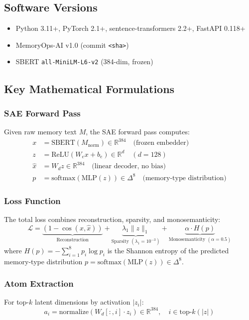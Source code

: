 \documentclass[11pt]{article}
\newcommand{\R}{\mathbb{R}}
\begin{document}
\subsection{Software Versions}
\begin{itemize}
  \item Python 3.11+, PyTorch 2.1+, sentence-transformers 2.2+, FastAPI 0.118+
  \item MemoryOps-AI v1.0 (commit \texttt{<sha>})
  \item SBERT \texttt{all-MiniLM-L6-v2} (384-dim, frozen)
\end{itemize}

\subsection{Key Mathematical Formulations}

\subsubsection{SAE Forward Pass}
Given raw memory text $M$, the SAE forward pass computes:
\begin{align}
x &= \text{SBERT}(M_{\text{norm}}) \in \R^{384} \quad \text{(frozen embedder)} \\
z &= \text{ReLU}(W_e x + b_e) \in \R^{d} \quad (d=128) \\
\hat{x} &= W_d z \in \R^{384} \quad \text{(linear decoder, no bias)} \\
p &= \text{softmax}(\text{MLP}(z)) \in \Delta^{8} \quad \text{(memory-type distribution)}
\end{align}

\subsubsection{Loss Function}
The total loss combines reconstruction, sparsity, and monosemanticity:
\begin{equation}
\mathcal{L} = \underbrace{(1 - \cos(x,\hat{x}))}_{\text{Reconstruction}} 
+ \underbrace{\lambda_1 \|z\|_1}_{\text{Sparsity } (\lambda_1=10^{-3})}
+ \underbrace{\alpha \cdot H(p)}_{\text{Monosemanticity } (\alpha=0.5)}
\end{equation}
where $H(p) = -\sum_{i=1}^{8} p_i \log p_i$ is the Shannon entropy of the predicted memory-type distribution $p = \text{softmax}(\text{MLP}(z)) \in \Delta^{8}$.

\subsubsection{Atom Extraction}
For top-$k$ latent dimensions by activation $|z_i|$:
\begin{equation}
a_i = \text{normalize}(W_d[:,i] \cdot z_i) \in \R^{384}, \quad i \in \text{top-}k(|z|)
\end{equation}
\end{document}

